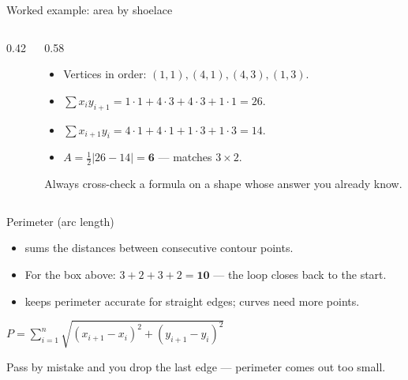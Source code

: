 \documentclass[10pt,aspectratio=169]{beamer}
\begin{document}
\begin{frame}{Worked example: area by shoelace}
  \begin{columns}[T]
    \begin{column}{0.42\textwidth}
    \begin{center}
    \end{center}
    \end{column}
    \begin{column}{0.58\textwidth}
      \begin{itemize}\scriptsize
        \item Vertices in order: $(1,1),(4,1),(4,3),(1,3)$.
        \item $\sum x_i y_{i+1}=1\!\cdot\!1+4\!\cdot\!3+4\!\cdot\!3+1\!\cdot\!1=26$.
        \item $\sum x_{i+1} y_i=4\!\cdot\!1+4\!\cdot\!1+1\!\cdot\!3+1\!\cdot\!3=14$.
        \item $A=\tfrac12|26-14|=\mathbf{6}$ — matches $3\times2$. \checkmark
      \end{itemize}
      \begin{infobox}
        Always cross-check a formula on a shape whose answer you already know.
      \end{infobox}
    \end{column}
  \end{columns}
\end{frame}

\begin{frame}{Perimeter (arc length)}
  \begin{itemize}
    \item {} sums the distances between consecutive contour points.
    \item For the box above: $3+2+3+2=\mathbf{10}$ — the loop closes back to the start.
    \item {} keeps perimeter accurate for straight edges; curves need more points.
  \end{itemize}
  \begin{mathbox}[Perimeter]
    \( P=\sum_{i=1}^{n}\sqrt{(x_{i+1}-x_i)^2+(y_{i+1}-y_i)^2} \)
  \end{mathbox}
  \begin{badbox}
    Pass  by mistake and you drop the last edge — perimeter comes out too small.
  \end{badbox}
\end{frame}
\end{document}
